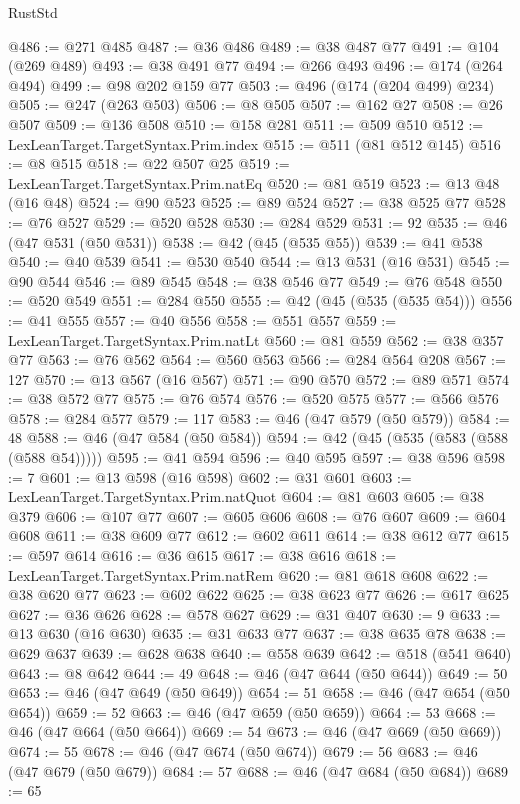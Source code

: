 \begin{lexlean}{RustStd}
\begin{coremodule}
{\begin{coremodule}
{{{{{{{{{{{{{{@486 := @271 @485
@487 := @36 @486
@489 := @38 @487 @77
@491 := @104 (@269 @489)
@493 := @38 @491 @77
@494 := @266 @493
@496 := @174 (@264 @494)
@499 := @98 @202 @159 @77
@503 := @496 (@174 (@204 @499) @234)
@505 := @247 (@263 @503)
@506 := @8 @505
@507 := @162 @27
@508 := @26 @507
@509 := @136 @508
@510 := @158 @281
@511 := @509 @510
@512 := LexLeanTarget.TargetSyntax.Prim.index
@515 := @511 (@81 @512 @145)
@516 := @8 @515
@518 := @22 @507 @25
@519 := LexLeanTarget.TargetSyntax.Prim.natEq
@520 := @81 @519
@523 := @13 @48 (@16 @48)
@524 := @90 @523
@525 := @89 @524
@527 := @38 @525 @77
@528 := @76 @527
@529 := @520 @528
@530 := @284 @529
@531 := 92
@535 := @46 (@47 @531 (@50 @531))
@538 := @42 (@45 (@535 @55))
@539 := @41 @538
@540 := @40 @539
@541 := @530 @540
@544 := @13 @531 (@16 @531)
@545 := @90 @544
@546 := @89 @545
@548 := @38 @546 @77
@549 := @76 @548
@550 := @520 @549
@551 := @284 @550
@555 := @42 (@45 (@535 (@535 @54)))
@556 := @41 @555
@557 := @40 @556
@558 := @551 @557
@559 := LexLeanTarget.TargetSyntax.Prim.natLt
@560 := @81 @559
@562 := @38 @357 @77
@563 := @76 @562
@564 := @560 @563
@566 := @284 @564 @208
@567 := 127
@570 := @13 @567 (@16 @567)
@571 := @90 @570
@572 := @89 @571
@574 := @38 @572 @77
@575 := @76 @574
@576 := @520 @575
@577 := @566 @576
@578 := @284 @577
@579 := 117
@583 := @46 (@47 @579 (@50 @579))
@584 := 48
@588 := @46 (@47 @584 (@50 @584))
@594 := @42 (@45 (@535 (@583 (@588 (@588 @54)))))
@595 := @41 @594
@596 := @40 @595
@597 := @38 @596
@598 := 7
@601 := @13 @598 (@16 @598)
@602 := @31 @601
@603 := LexLeanTarget.TargetSyntax.Prim.natQuot
@604 := @81 @603
@605 := @38 @379
@606 := @107 @77
@607 := @605 @606
@608 := @76 @607
@609 := @604 @608
@611 := @38 @609 @77
@612 := @602 @611
@614 := @38 @612 @77
@615 := @597 @614
@616 := @36 @615
@617 := @38 @616
@618 := LexLeanTarget.TargetSyntax.Prim.natRem
@620 := @81 @618 @608
@622 := @38 @620 @77
@623 := @602 @622
@625 := @38 @623 @77
@626 := @617 @625
@627 := @36 @626
@628 := @578 @627
@629 := @31 @407
@630 := 9
@633 := @13 @630 (@16 @630)
@635 := @31 @633 @77
@637 := @38 @635 @78
@638 := @629 @637
@639 := @628 @638
@640 := @558 @639
@642 := @518 (@541 @640)
@643 := @8 @642
@644 := 49
@648 := @46 (@47 @644 (@50 @644))
@649 := 50
@653 := @46 (@47 @649 (@50 @649))
@654 := 51
@658 := @46 (@47 @654 (@50 @654))
@659 := 52
@663 := @46 (@47 @659 (@50 @659))
@664 := 53
@668 := @46 (@47 @664 (@50 @664))
@669 := 54
@673 := @46 (@47 @669 (@50 @669))
@674 := 55
@678 := @46 (@47 @674 (@50 @674))
@679 := 56
@683 := @46 (@47 @679 (@50 @679))
@684 := 57
@688 := @46 (@47 @684 (@50 @684))
@689 := 65
}}}}}}}}}}}}}}
\end{coremodule}}
\end{coremodule}
\end{lexlean}
